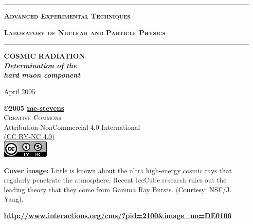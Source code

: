 	\AddToShipoutPicture*{\BackgroundPic}

	\begin{center}

		\vspace*{-2cm}
		\color{white}

		\hrule %

		\huge{\textsc {\textbf{Advanced Experimental Techniques}}}

		\large{\textsc {\textbf{Laboratory of Nuclear and Particle Physics}}}
		\vspace*{2ex}

		\hrule %
		
		 
		\begin{large}
			\color{white}
			\textbf{
				COSMIC RADIATION\\
				\textit{
					Determination of the\\
					hard muon component
				}%
			}%

			\vfill

			April 2005
		\end{large}

		\vspace*{-3cm}

	\end{center}

	\newpage
	\thispagestyle{empty}
	\phantom{hola!}
		
	\null
	\vfill
	\bc
		\begin{minipage}{0.65\textwidth}
			{\sffamily
				\bc
					\textbf{\copyright 2005 \href{https://github.com/me-stevens}{\textbf{me-stevens}}}\\
					\textsc{Creative Commons}\\
					Attribution-NonCommercial 4.0 International\\
					\href{http://creativecommons.org/licenses/by-nc/4.0/legalcode}{(CC BY-NC 4.0)}\\[12pt]
					\includegraphics{img/license.png}\\[12pt]
				\ec
	
				\small\textbf{Cover image:} Little is known about the ultra high-energy cosmic rays that regularly penetrate the atmosphere. Recent IceCube research rules out the leading theory that they come from Gamma Ray Bursts. (Courtesy: NSF/J. Yang).
			}%
		\end{minipage}\vspace*{1ex}
		\small\href{http://www.interactions.org/cms/?pid=2100&image_no=DE0106}{\textbf{\url{http://www.interactions.org/cms/?pid=2100&image_no=DE0106}}}
	\ec
